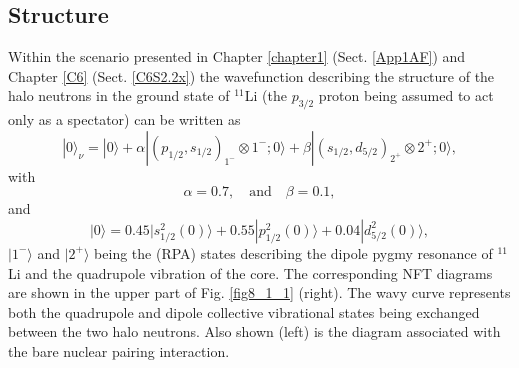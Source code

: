 \subsection{Structure}
Within the scenario presented in Chapter \ref{chapter1}  (Sect. \ref{App1AF}) and Chapter \ref{C6} (Sect. \ref{C6S2.2x}) the wavefunction describing the structure of the halo neutrons in the ground state of $^{11}$Li (the $p_{3/2}$ proton being assumed to act only as a spectator) can be written as
\begin{equation}\label{eq8_2_1}
|0\rangle_\nu=|0\rangle+\alpha|(p_{1/2},s_{1/2})_{1^-}\otimes 1^-;0\rangle+\beta|(s_{1/2},d_{5/2})_{2^+}\otimes 2^+;0\rangle,
\end{equation}
with
\begin{equation}\label{eq8_2_2}
\alpha=0.7,\quad \text{and} \quad \beta=0.1,
\end{equation}
and
\begin{equation}\label{eq8_2_3}
|0\rangle=0.45|s_{1/2}^2(0)\rangle+0.55|p_{1/2}^2(0)\rangle+0.04|d_{5/2}^2(0)\rangle,
\end{equation}
$|1^-\rangle$ and $|2^+\rangle$ being the (RPA) states describing the dipole pygmy resonance of $^{11}$Li and the quadrupole vibration of the core. The corresponding NFT diagrams are shown in the upper part of Fig. \ref{fig8_1_1} (right). The wavy curve represents both the quadrupole and dipole collective vibrational states being exchanged between the two halo neutrons. Also shown (left) is the diagram associated with the bare nuclear pairing interaction.



